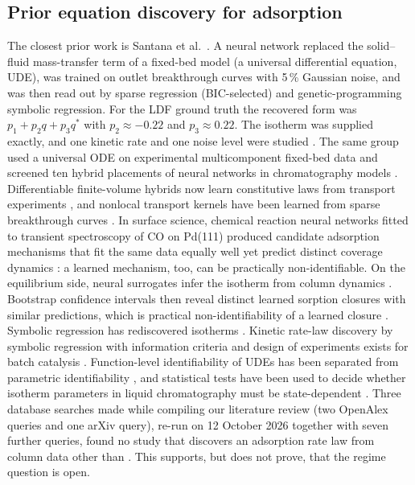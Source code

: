 \documentclass[11pt]{article}
\newcommand{\qs}{q^{*}}
\begin{document}
\subsection*{Prior equation discovery for adsorption}
The closest prior work is Santana et al.\ \citep{santana2023}. A neural network replaced
the solid--fluid mass-transfer term of a fixed-bed model (a universal differential
equation, UDE), was trained on outlet breakthrough curves with 5\,\% Gaussian noise, and
was then read out by sparse regression (BIC-selected) and genetic-programming symbolic
regression. For the LDF ground truth the recovered form was $p_1 + p_2 q + p_3\qs$ with
$p_2 \approx -0.22$ and $p_3 \approx 0.22$. The isotherm was supplied exactly, and one
kinetic rate and one noise level were studied \citep{santana2023}. The same group used a
universal ODE on experimental multicomponent fixed-bed data \citep{nogueira2022} and
screened ten hybrid placements of neural networks in chromatography models
\citep{frandsen2025}. Differentiable finite-volume hybrids now learn constitutive laws
from transport experiments \citep{jessop2026}, and nonlocal transport kernels have been
learned from sparse breakthrough curves \citep{xu2022}. In surface science, chemical
reaction neural networks fitted to transient spectroscopy of CO on Pd(111) produced
candidate adsorption mechanisms that fit the same data equally well yet predict distinct
coverage dynamics \citep{shukla2025}: a learned mechanism, too, can be practically
non-identifiable. On the equilibrium side, neural
surrogates infer the isotherm from column dynamics \citep{praditia2022,subraveti2022}.
Bootstrap confidence intervals then reveal distinct learned sorption closures with similar
predictions, which is practical non-identifiability of a learned closure
\citep{scheurer2026}. Symbolic regression has rediscovered isotherms
\citep{haghpanah2023,sharlin2024,cornelio2023,fox2023}. Kinetic rate-law discovery by
symbolic regression with information criteria and design of experiments exists for batch
catalysis \citep{servia2024,servia2025}. Function-level identifiability of UDEs has been
separated from parametric identifiability \citep{loman2025}, and statistical tests have
been used to decide whether isotherm parameters in liquid chromatography must be
state-dependent \citep{katsoulas2026}. Three database searches made while compiling our
literature review (two OpenAlex queries and one arXiv query), re-run on 12 October 2026
together with seven further queries, found no study that discovers an adsorption rate law
from column data other than \citep{santana2023}. This supports, but does not prove, that
the regime question is open.
\end{document}
